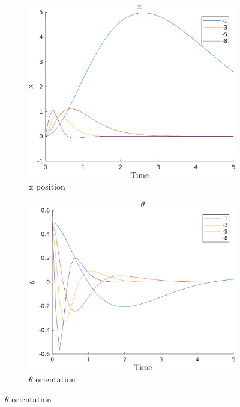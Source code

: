 \documentclass{article}
\begin{document}
 
\begin{figure}[H]
    \centering
    \begin{subfigure}{0.45\textwidth}
        \centering
        \includegraphics[width = \textwidth]{figures/x_plot.png}
        \caption{x position}
    \end{subfigure}
    \begin{subfigure}{0.45\textwidth}
        \centering
        \includegraphics[width = \textwidth]{figures/theta_plot.png}
        \caption{$\theta$ orientation}
    \end{subfigure}

\end{figure}
\end{document}

